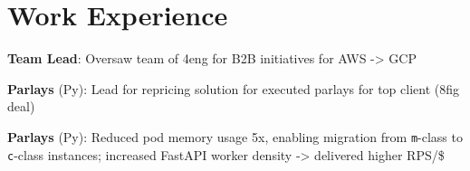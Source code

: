 \documentclass[]{deedy-resume}
\begin{document}
\begin{minipage}[t]{0.66\textwidth} 


\section{Work Experience}

\vspace{\topsep}
\begin{tightitemize}
    \item \textbf{Team Lead}: Oversaw team of 4eng for B2B initiatives for AWS -> GCP
    \item \textbf{Parlays} (Py):  Lead for repricing solution for executed parlays for top client (8fig deal)
    \item \textbf{Parlays} (Py): Reduced pod memory usage 5x, enabling migration from \texttt{m}-class to \texttt{c}-class instances; increased FastAPI worker density -> delivered higher RPS/\$
\end{tightitemize}
\sectionspace



\end{minipage}
\end{document}
